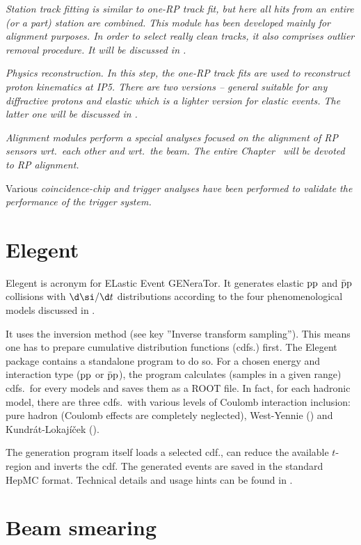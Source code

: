 \em{Station track fitting} is similar to one-RP track fit, but here all hits from an entire (or a part) station are combined. This module has been developed mainly for alignment purposes. In order to select really clean tracks, it also comprises outlier removal procedure. It will be discussed in .

\em{Physics reconstruction}.
In this step, the one-RP track fits are used to reconstruct proton kinematics at IP5. There are two versions -- \em{general} suitable for any diffractive protons and \em{elastic} which is a lighter version for elastic events. The latter one will be discussed in .

\em{Alignment} modules perform a special analyses focused on the alignment of RP sensors wrt.~each other and wrt.~the beam. The entire Chapter~ will be devoted to RP alignment. 

Various \em{coincidence-chip and trigger analyses} have been performed to validate the performance of the trigger system.

\section[elegent]{Elegent}

Elegent is acronym for ELastic Event GENeraTor. It generates elastic $\rm pp$ and $\rm\bar pp$ collisions with $\d\si/\d t$ distributions according to the four phenomenological models discussed in .

It uses the inversion method (see  key ''Inverse transform sampling''). This means one has to prepare cumulative distribution functions (cdfs.) first. The Elegent package contains a standalone program to do so. For a chosen energy and interaction type ($\rm pp$ or $\rm\bar pp$), the program calculates (samples in a given range) cdfs.~for every models and saves them as a ROOT file. In fact, for each hadronic model, there are three cdfs.~with various levels of Coulomb interaction inclusion: pure hadron (Coulomb effects are completely neglected), West-Yennie () and Kundr\' at-Lokaj\' i\v cek ().

The generation program itself loads a selected cdf., can reduce the available $t$-region and inverts the cdf. The generated events are saved in the standard HepMC format. Technical details and usage hints can be found in .


\section[beam smearing]{Beam smearing}

